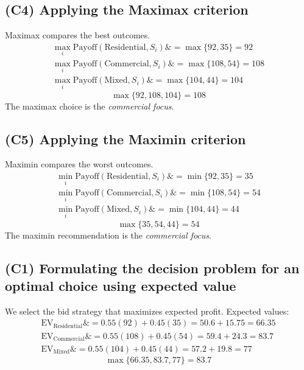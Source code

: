 \documentclass[11pt]{article}
\begin{document}
	\subsection*{(C4) Applying the Maximax criterion}
	
	\hypertarget{problem9-c4}{}
	
	Maximax compares the best outcomes.
	\[
	\begin{aligned}
		\max_i \text{Payoff}(\text{Residential}, S_i) \&= \max\{92, 35\} = 92 \\
		\max_i \text{Payoff}(\text{Commercial}, S_i) \&= \max\{108, 54\} = 108 \\
		\max_i \text{Payoff}(\text{Mixed}, S_i) \&= \max\{104, 44\} = 104
	\end{aligned}
	\]
	\[
	\max\{92, 108, 104\} = 108
	\]
	The maximax choice is the \emph{commercial focus}.
	
	\subsection*{(C5) Applying the Maximin criterion}
	
	\hypertarget{problem9-c5}{}
	
	Maximin compares the worst outcomes.
	\[
	\begin{aligned}
		\min_i \text{Payoff}(\text{Residential}, S_i) \&= \min\{92, 35\} = 35 \\
		\min_i \text{Payoff}(\text{Commercial}, S_i) \&= \min\{108, 54\} = 54 \\
		\min_i \text{Payoff}(\text{Mixed}, S_i) \&= \min\{104, 44\} = 44
	\end{aligned}
	\]
	\[
	\max\{35, 54, 44\} = 54
	\]
	The maximin recommendation is the \emph{commercial focus}.
	
	\subsection*{(C1) Formulating the decision problem for an optimal choice using expected value}
	
	\hypertarget{problem9-c1}{}
	
	We select the bid strategy that maximizes expected profit. Expected values:
	\[
	\begin{aligned}
		\mathrm{EV}_{\text{Residential}} \&= 0.55(92) + 0.45(35) = 50.6 + 15.75 = 66.35 \\
		\mathrm{EV}_{\text{Commercial}} \&= 0.55(108) + 0.45(54) = 59.4 + 24.3 = 83.7 \\
		\mathrm{EV}_{\text{Mixed}} \&= 0.55(104) + 0.45(44) = 57.2 + 19.8 = 77
	\end{aligned}
	\]
	\[
	\max\{66.35, 83.7, 77\} = 83.7
	\]
	
\end{document}
